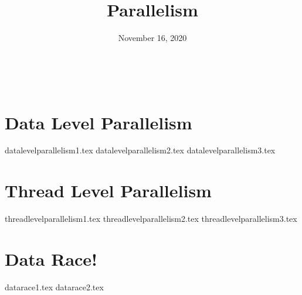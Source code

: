 \documentclass[11pt]{exam}
\title{Parallelism}
\date{November 16, 2020}
\begin{document}
\maketitle
​
\section{Data Level Parallelism}
\begin{questions}
{datalevelparallelism1.tex}
{datalevelparallelism2.tex}
{datalevelparallelism3.tex}
\end{questions}
\newpage

\section{Thread Level Parallelism}
\begin{questions}
{threadlevelparallelism1.tex}
{threadlevelparallelism2.tex}
{threadlevelparallelism3.tex}
\end{questions}
\newpage

\section{Data Race!}
\begin{questions}
{datarace1.tex}
{datarace2.tex}
\end{questions}
\newpage
\end{document}
